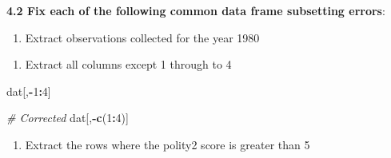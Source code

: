 \documentclass[]{book}
\newenvironment{Shaded}{\begin{snugshade}}{\end{snugshade}}
\newcommand{\KeywordTok}[1]{\textcolor[rgb]{0.13,0.29,0.53}{\textbf{#1}}}
\newcommand{\DecValTok}[1]{\textcolor[rgb]{0.00,0.00,0.81}{#1}}
\newcommand{\StringTok}[1]{\textcolor[rgb]{0.31,0.60,0.02}{#1}}
\newcommand{\CommentTok}[1]{\textcolor[rgb]{0.56,0.35,0.01}{\textit{#1}}}
\newcommand{\OperatorTok}[1]{\textcolor[rgb]{0.81,0.36,0.00}{\textbf{#1}}}
\newcommand{\NormalTok}[1]{#1}
\providecommand{\tightlist}{%
  \setlength{\itemsep}{0pt}\setlength{\parskip}{0pt}}
\begin{document}
\textbf{4.2 Fix each of the following common data frame subsetting
errors}:

\begin{enumerate}
\def\labelenumi{\arabic{enumi}.}
\tightlist
\item
  Extract observations collected for the year 1980
\end{enumerate}

\begin{Shaded}
\end{Shaded}

\begin{enumerate}
\def\labelenumi{\arabic{enumi}.}
\setcounter{enumi}{1}
\tightlist
\item
  Extract all columns except 1 through to 4
\end{enumerate}

\begin{Shaded}
\begin{Highlighting}[]
\NormalTok{dat[,}\OperatorTok{-}\DecValTok{1}\OperatorTok{:}\DecValTok{4}\NormalTok{]}

\CommentTok{# Corrected}
\NormalTok{dat[,}\OperatorTok{-}\KeywordTok{c}\NormalTok{(}\DecValTok{1}\OperatorTok{:}\DecValTok{4}\NormalTok{)]}
\end{Highlighting}
\end{Shaded}

\begin{enumerate}
\def\labelenumi{\arabic{enumi}.}
\setcounter{enumi}{2}
\tightlist
\item
  Extract the rows where the polity2 score is greater than 5
\end{enumerate}

\begin{Shaded}
\end{Shaded}
\end{document}
